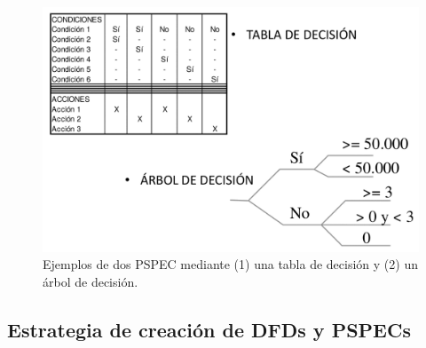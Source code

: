\begin{figure}[h!]
    \centering
    \includegraphics[width=0.6\linewidth]{Resources/Tema5/ejemplosPSPEC.png}
    \caption{Ejemplos de dos PSPEC mediante (1) una tabla de decisión y (2) un árbol de decisión.}
    \label{fig:ejemplosPSPEC}
\end{figure}

\subsection{Estrategia de creación de DFDs y PSPECs}

